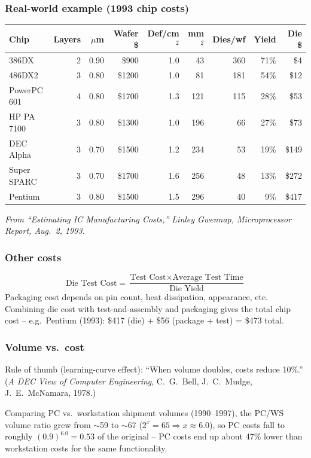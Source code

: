 \subsubsection{Real-world example (1993 chip costs)}
\begin{center}
\footnotesize
\begin{tabular}{@{}lrrrrrrrr@{}}
\toprule
Chip & Layers & $\mu$m & Wafer \$ & Def/cm$^2$ &
mm$^2$ & Dies/wf & Yield & Die \$ \\
\midrule
386DX      & 2 & 0.90 & \$900  & 1.0 & 43  & 360 & 71\% & \$4 \\
486DX2     & 3 & 0.80 & \$1200 & 1.0 & 81  & 181 & 54\% & \$12 \\
PowerPC 601& 4 & 0.80 & \$1700 & 1.3 & 121 & 115 & 28\% & \$53 \\
HP PA 7100 & 3 & 0.80 & \$1300 & 1.0 & 196 & 66  & 27\% & \$73 \\
DEC Alpha  & 3 & 0.70 & \$1500 & 1.2 & 234 & 53  & 19\% & \$149 \\
Super SPARC& 3 & 0.70 & \$1700 & 1.6 & 256 & 48  & 13\% & \$272 \\
Pentium    & 3 & 0.80 & \$1500 & 1.5 & 296 & 40  & 9\%  & \$417 \\
\bottomrule
\end{tabular}
\end{center}
\emph{From ``Estimating IC Manufacturing Costs,'' Linley Gwennap,
Microprocessor Report, Aug.\ 2, 1993.}

\subsubsection{Other costs}
\[
  \text{Die Test Cost} = \frac{\text{Test Cost} \times \text{Average Test
  Time}}{\text{Die Yield}}
\]
Packaging cost depends on pin count, heat dissipation, appearance, etc.
Combining die cost with test-and-assembly and packaging gives the total
chip cost -- e.g.\ Pentium (1993): \$417 (die) + \$56 (package + test) =
\$473 total.

\subsubsection{Volume vs.\ cost}
\begin{note}
Rule of thumb (learning-curve effect): ``When volume doubles, costs reduce
10\%.''\; (\emph{A DEC View of Computer Engineering}, C.~G.~Bell,
J.~C.~Mudge, J.~E.~McNamara, 1978.)
\end{note}

\begin{eg}
Comparing PC vs.\ workstation shipment volumes (1990--1997), the PC/WS
volume ratio grew from $\sim$59 to $\sim$67 ($2^x = 65 \Rightarrow x
\approx 6.0$), so PC costs fall to roughly $(0.9)^{6.0} = 0.53$ of the
original -- PC costs end up about 47\% lower than workstation costs for the
same functionality.
\end{eg}

